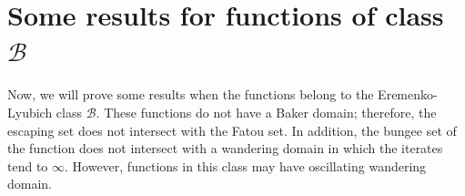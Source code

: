 \documentclass[a4paper,12pt]{amsart}
\numberwithin{equation}{section}
\begin{document}

\section{Some results for functions of class $\mathcal{B}$}
Now, we will prove some results when the functions belong to  the Eremenko-Lyubich class $\mathcal{B}$. 
These functions do not have a Baker domain; therefore, the escaping set does not intersect with the Fatou set. In addition,  the bungee set of the function does not intersect with a wandering domain in which the iterates tend to $\infty.$ However, functions in this class may have oscillating wandering domain. 
\end{document}
